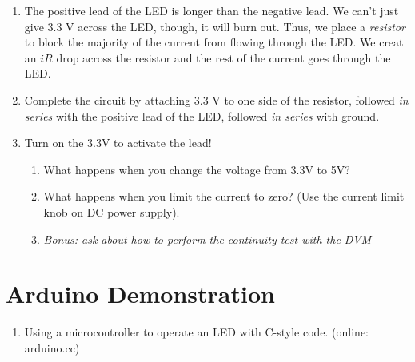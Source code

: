 \documentclass{article}
\begin{document}
\begin{enumerate}
\item The positive lead of the LED is longer than the negative lead.  We can't just give 3.3 V across the LED, though, it will burn out.  Thus, we place a \textit{resistor} to block the majority of the current from flowing through the LED.  We creat an $iR$ drop across the resistor and the rest of the current goes through the LED.
\item Complete the circuit by attaching 3.3 V to one side of the resistor, followed \textit{in series} with the positive lead of the LED, followed \textit{in series} with ground.
\item Turn on the 3.3V to activate the lead!
\begin{enumerate}
\item What happens when you change the voltage from 3.3V to 5V?
\item What happens when you limit the current to zero?  (Use the current limit knob on DC power supply).
\item \textit{Bonus: ask about how to perform the continuity test with the DVM}
\end{enumerate}
\end{enumerate}

\section{Arduino Demonstration}

\begin{enumerate}
\item Using a microcontroller to operate an LED with C-style code. (online: arduino.cc)
\end{enumerate}
\end{document}
